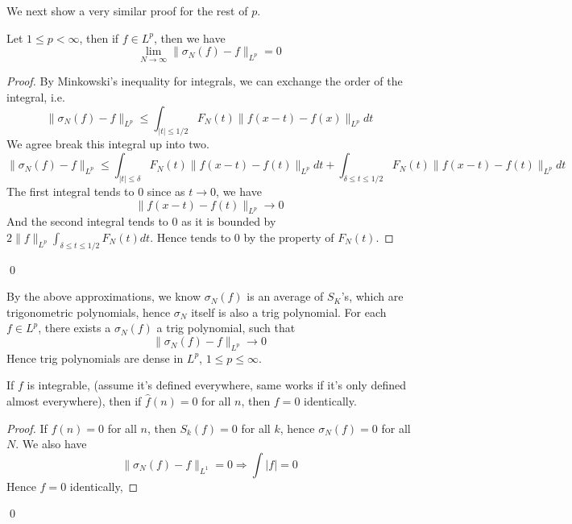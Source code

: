 We next show a very similar proof for the rest of $p$.
\begin{theorem}
    Let $1\leq p<\infty$, then if $f\in L^p$, then we have
    \begin{equation*}
        \lim_{N\to\infty}\|\sigma_N(f)-f\|_{L^p}=0
    \end{equation*}
\end{theorem}
\begin{proof}
    By Minkowski's inequality for integrals, we can exchange the order of the integral, i.e.
    \begin{equation*}
        \|\sigma_N(f)-f\|_{L^p}\leq \int_{|t|\leq1/2} F_N(t)\|f(x-t)-f(x)\|_{L^p}dt
    \end{equation*}
    We agree break this integral up into two.
    \begin{equation*}
        \|\sigma_N(f)-f\|_{L^p}\leq \int_{|t|\leq\delta}F_N(t)\|f(x-t)-f(t)\|_{L^p}dt+\int_{\delta\leq t\leq1/2}F_N(t)\|f(x-t)-f(t)\|_{L^p}dt
    \end{equation*}
    The first integral tends to 0 since as $t\to 0$, we have
    \begin{equation*}
        \|f(x-t)-f(t)\|_{L^p}\to 0
    \end{equation*}
    And the second integral tends to 0 as it is bounded by $2\|f\|_{L^p}\int_{\delta\leq t\leq 1/2}F_N(t)dt$. Hence tends to 0 by the property of $F_N(t)$.
\end{proof}
\qed

\begin{corollary}
    By the above approximations, we know $\sigma_N(f)$ is an average of $S_K$'s, which are trigonometric polynomials, hence $\sigma_N$ itself is also a trig polynomial. For each $f\in L^p$, there exists a $\sigma_N(f)$ a trig polynomial, such that 
    \begin{equation*}
        \|\sigma_N(f)-f\|_{L^p}\to 0
    \end{equation*}
    Hence trig polynomials are dense in $L^p$, $1\leq p\leq\infty$.
\end{corollary}

\begin{corollary}
    If $f$ is integrable, (assume it's defined everywhere, same works if it's only defined almost everywhere), then if $\hat{f}(n)=0$ for all $n$, then $f=0$ identically.
\end{corollary}
\begin{proof}
    If $\hat{f}(n)=0$ for all $n$, then $S_k(f)=0$ for all $k$, hence $\sigma_N(f)=0$ for all $N$. We also have
    \begin{equation*}
        \|\sigma_N(f)-f\|_{L^1}=0\Rightarrow \int|f|=0
    \end{equation*} 
    Hence $f=0$ identically,
\end{proof}
\qed

